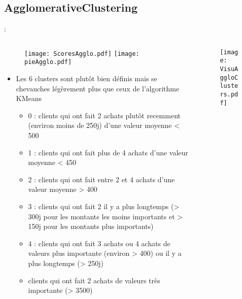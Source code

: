 \documentclass[8pt,aspectratio=169,hyperref={unicode=true}]{beamer}
\begin{document}
\subsection{AgglomerativeClustering}
\begin{frame}{\insertsection: \insertsubsection}
    \begin{columns}
        \begin{column}{.55\textwidth}
            \begin{figure}
                \texttt{[image: ScoresAgglo.pdf]}
                \texttt{[image: pieAgglo.pdf]}
            \end{figure}
            \begin{itemize}
                \footnotesize
                \item Les 6 clusters sont plutôt bien définis mais se chevauches légèrement plus que ceux de l'algorithme KMeans
                      \begin{itemize}
                          \scriptsize
                          \item 0 : clients qui ont fait 2 achats plutôt recemment (environ moins de 250j) d'une valeur moyenne < 500
                          \item 1 : clients qui ont fait plus de 4 achats d'une valeur moyenne < 450
                          \item 2 : clients qui ont fait entre 2 et 4 achats d'une valeur moyenne > 400
                          \item 3 : clients qui ont fait 2 il y a plus longtemps (> 300j pour les montants les moins importants et > 150j pour les montants plus importants)
                          \item 4 : clients qui ont fait 3 achats ou 4 achats de valeurs plus importante (environ > 400) ou il y a plus longtemps (> 250j)
                          \item clients qui ont fait 2 achats de valeurs très importante (> 3500)
                      \end{itemize}
            \end{itemize}
        \end{column}
        \begin{column}{.45\textwidth}
            \begin{figure}
                \texttt{[image: VisuAggloClusters.pdf]}
            \end{figure}
        \end{column}
    \end{columns}
\end{frame}
\end{document}
